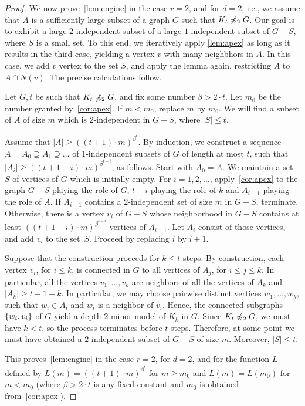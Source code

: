 \begin{proof}	
We now prove~\cref{lem:engine} in the case $r=2$, and for $d=2$, i.e., we assume that $A$ is a sufficiently large subset of a graph $G$ such that $K_t\not\preccurlyeq_2 G$.
Our goal is to exhibit a large $2$-independent subset 
of a large $1$-independent subset of  $G-S$, where $S$ is a small set. 
To this end, we iteratively apply \cref{lem:apex} as long as  it results in the third case, yielding a vertex $v$ with many neighbhors in $A$. In this case, we add $v$ vertex to the set $S$, and apply the lemma again,
restricting $A$ to $A\cap N(v)$. 
The precise calculations follow.

Let $G,t$ be such that $K_t\not\preccurlyeq_2 G$, and fix some number $\beta>2\cdot t$. Let $m_0$ be the number granted by~\cref{cor:apex}. If $m<m_0$, replace $m$ by $m_0$. We will find 
a subset of $A$ of size $m$ which is $2$-independent in $G-S$, where $|S|\le t$.


Assume that $|A|\ge ((t+1)\cdot m)^{\beta^{t}}$. By induction, we
 construct a sequence  $A=A_0\supseteq A_1\supseteq\ldots$ 
of $1$-independent subsets of $G$
of length at most $t$,
such that $|A_i|\ge ((t+1-i)\cdot m)^{\beta^{t-i}}$,
 as follows. Start with $A_0=A$. We maintain a set $S$ of vertices of $G$ which is initially empty.
For $i=1,2,\ldots$,
 apply~\cref{cor:apex} to the graph $G-S$ playing the role of $G$, 
$t-i$ playing the role of $k$ and $A_{i-1}$ playing the role of $A$.
If $A_{i-1}$ contains a $2$-independent set of size $m$ in $G-S$, terminate.
 Otherwise, there is a vertex $v_i$ of $G-S$
 whose neighborhood in $G-S$ contains at least
 $((t+1-i)\cdot m)^{\beta^{t-i}}$ vertices of $A_{i-1}$.
 Let $A_{i}$ consist of those vertices, and add $v_i$
 to the set~$S$.  
  Proceed by replacing $i$ by $i+1$.
 
Suppose that the construction proceeds for $k\le t$ steps.
By construction, each vertex $v_i$, for $i\le k$, is connected in $G$
 to all vertices of $A_{j}$, for $i\le j\le k$. In particular, all the vertices $v_1,\ldots,v_k$ are neighbors of all the vertices of $A_{k}$
 and $|A_k|\ge t+1-k$.
 In particular, we may choose pairwise distinct vertices $w_1,\ldots,w_k$,
 such that $w_i\in A_i$ and $w_i$ is a neighbor of $v_i$.
 Hence, the connected subgraphs $\{w_i,v_i\}$ of $G$ yield a depth-$2$ minor model of $K_k$ in $G$.
 Since $K_t\not\preccurlyeq_2 G$, we must have $k<t$, so the process terminates before $t$ steps.
 Therefore, at some point we must have obtained a $2$-independent subset of $G-S$ of size $m$.
 Moreover, $|S|\le t$.
 
 This proves~\cref{lem:engine} in the case $r=2$, for $d=2$, and for the function $L$ defined by $L(m)=((t+1)\cdot m)^{\beta^t}$
 for $m\ge m_0$ and $L(m)=L(m_0)$ for $m<m_0$ (where $\beta>2\cdot t$ is any fixed constant and $m_0$ is obtained from~\cref{cor:apex}).
\end{proof}


